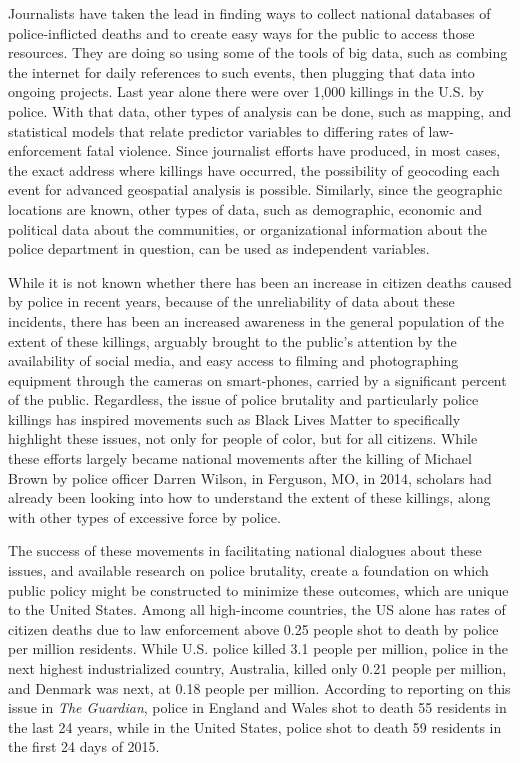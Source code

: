 \documentclass[sigconf]{acmart}
\begin{document}
Journalists have taken the lead in finding ways to collect national databases of police-inflicted deaths and to create easy ways for the public to access those resources. \cite{currie16,nix17,counted,fatalforce} They are doing so using some of the tools of big data, such as combing the internet for daily references to such events, then plugging that data into ongoing projects.  Last year alone there were over 1,000 killings in the U.S. by police. \cite{counted}  With that data, other types of analysis can be done, such as mapping, and statistical models that relate predictor variables to differing rates of law-enforcement fatal violence.  Since journalist efforts have produced, in most cases, the exact address where killings have occurred, the possibility of geocoding each event for advanced geospatial analysis is possible. \cite{dalton17}  Similarly, since the geographic locations are known, other types of data, such as demographic, economic and political data about the communities, or organizational information about the police department in question, can be used as independent variables. \cite{smith04,legewie15}

While it is not known whether there has been an increase in citizen deaths caused by police in recent years, because of the unreliability of data about these incidents, there has been an increased awareness in the general population of the extent of these killings, arguably brought to the public's attention by the availability of social media, and easy access to filming and photographing equipment through the cameras on smart-phones, carried by a significant percent of the public. \cite{bonilla15,brucato15,nix17}  Regardless, the issue of police brutality and particularly police killings has inspired movements such as Black Lives Matter to specifically highlight these issues, not only for people of color, but for all citizens.  While these efforts largely became national movements after the killing of Michael Brown by police officer Darren Wilson, in Ferguson, MO, in 2014, scholars had already been looking into how to understand the extent of these killings, along with other types of excessive force by police. \cite{smith04,smith14,meeks06,schneider14,chaney13,holmes00}  

The success of these movements in facilitating national dialogues about these issues, and available research on police brutality, create a foundation on which public policy might be constructed to minimize these outcomes, which are unique to the United States. Among all high-income countries, the US alone has rates of citizen deaths due to law enforcement above 0.25 people shot to death by police per million residents.  While U.S. police killed 3.1 people per million, police in the next highest industrialized country, Australia, killed only 0.21 people per million, and Denmark was next, at 0.18 people per million. \cite{ser16}  According to reporting on this issue in {\em The Guardian}, police in England and Wales shot to death 55 residents in the last 24 years, while in the United States, police shot to death 59 residents in the first 24 days of 2015. \cite{lartey15} 
\end{document}
